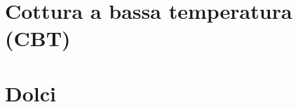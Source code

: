\documentclass{article}
\begin{document}
\newpage
\part{Cottura a bassa temperatura (CBT)}


%
\newpage
\part{Dolci}






\end{document}
